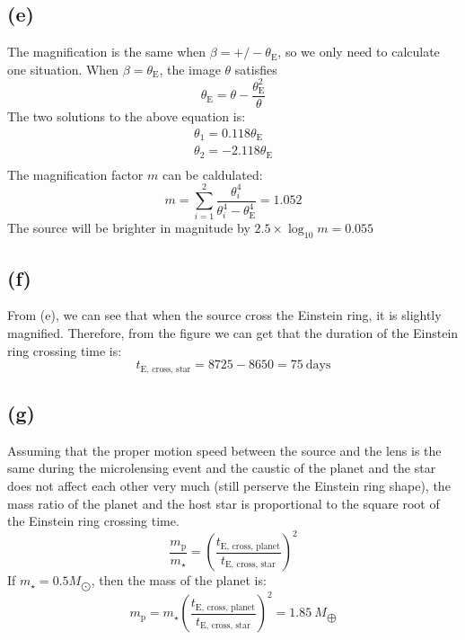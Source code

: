 \documentclass[a4paper,12pt]{article}
\begin{document}
\subsection*{(e)}
The magnification is the same when $\beta = +/-\theta_{\text{E}}$, so we only need to 
calculate one situation. When $\beta = \theta_{\text{E}}$, the image $\theta$ satisfies
\begin{equation}
    \theta_\text{E} = \theta - \frac{\theta_{\text{E}}^2}{\theta}
\end{equation}
The two solutions to the above equation is:
\begin{align*}
    \theta_1 = 0.118 \theta_{\text{E}} \\
    \theta_2 = -2.118 \theta_{\text{E}} \\
\end{align*}
The magnification factor $m$ can be caldulated:
\begin{equation}
    m = \sum_{i = 1}^{2} \frac{\theta_i^4}{\theta_i^4 - \theta_{\text{E}}^4} = 1.052
\end{equation}
The source will be brighter in magnitude by $2.5\times \log_{10} m = 0.055$

\subsection*{(f)}
From (e), we can see that when the source cross the 
Einstein ring, it is slightly magnified. Therefore, 
from the figure we can get that the duration of the Einstein 
ring crossing time is:
\begin{equation}
    t_{\text{E, cross, star}} = 8725 - 8650 = 75 \ \text{days}
\end{equation}

\subsection*{(g)}
Assuming that the proper motion speed between the source 
and the lens is the same during the microlensing event
and the caustic of the planet and the star does not affect each other
 very much (still perserve the Einstein ring shape), 
the mass ratio of the planet and the host star 
is proportional to the square root of the Einstein ring 
crossing time.
\begin{equation}
    \frac{m_{\text{p}}}{m_{\star}} = (\frac{t_{\text{E, cross, planet}}}{t_{\text{E, cross, star}}})^2
\end{equation}
If $m_{\star} = 0.5 M_{\bigodot}$, then the mass of the planet is:
\begin{equation}
    m_{\text{p}} = m_\star (\frac{t_{\text{E, cross, planet}}}{t_{\text{E, cross, star}}})^2 = 1.85 \ M_{\bigoplus}
\end{equation}
\end{document}
